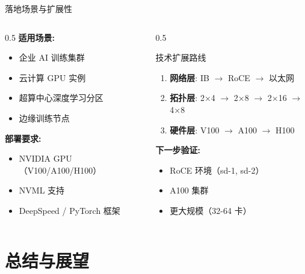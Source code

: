 \documentclass[aspectratio=169,10pt]{beamer}
\begin{document}
\begin{frame}{落地场景与扩展性}
\begin{columns}
\begin{column}{0.5\textwidth}
\textbf{适用场景:}
\begin{itemize}
    \item 企业 AI 训练集群
    \item 云计算 GPU 实例
    \item 超算中心深度学习分区
    \item 边缘训练节点
\end{itemize}
\vspace{0.3cm}
\textbf{部署要求:}
\begin{itemize}
    \item NVIDIA GPU（V100/A100/H100）
    \item NVML 支持
    \item DeepSpeed / PyTorch 框架
\end{itemize}
\end{column}
\begin{column}{0.5\textwidth}
\begin{block}{技术扩展路线}
\begin{enumerate}
    \item \textbf{网络层}: IB $\rightarrow$ RoCE $\rightarrow$ 以太网
    \item \textbf{拓扑层}: 2×4 $\rightarrow$ 2×8 $\rightarrow$ 2×16 $\rightarrow$ 4×8
    \item \textbf{硬件层}: V100 $\rightarrow$ A100 $\rightarrow$ H100
\end{enumerate}
\end{block}
\vspace{0.3cm}
\textbf{下一步验证:}
\begin{itemize}
    \item RoCE 环境（sd-1, sd-2）
    \item A100 集群
    \item 更大规模（32-64 卡）
\end{itemize}
\end{column}
\end{columns}
\end{frame}

\section{总结与展望}
\end{document}
